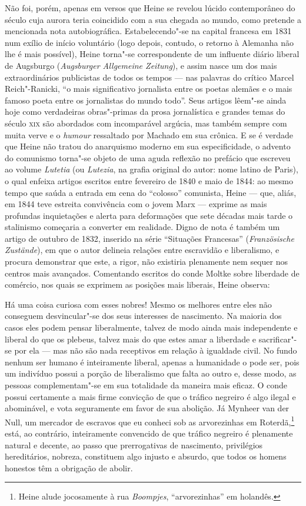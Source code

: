 Não foi, porém, apenas em versos que Heine se revelou lúcido
contemporâneo do século cuja aurora teria coincidido com a sua chegada
ao mundo, como pretende a mencionada nota autobiográfica.
Estabelecendo"-se na capital francesa em 1831 num exílio de início
voluntário (logo depois, contudo, o retorno à Alemanha não lhe é mais
possível), Heine torna"-se correspondente de um influente diário
liberal de Augsburgo (\textit{Augsburger Allgemeine Zeitung}), e assim
nasce um dos mais extraordinários publicistas de todos os tempos --- nas
palavras do crítico Marcel Reich"-Ranicki, “o mais significativo
jornalista entre os poetas alemães e o mais famoso poeta entre os
jornalistas do mundo todo”. Seus artigos lêem"-se ainda hoje como
verdadeiras obras"-primas da prosa jornalística e grandes temas do
século \textsc{xix} são abordados com incomparável argúcia, mas também sempre
com muita verve e o \textit{humour} ressaltado por Machado em sua
crônica. E se é verdade que Heine não tratou do anarquismo moderno em
sua especificidade, o advento do comunismo torna"-se objeto de uma
aguda reflexão no prefácio que escreveu ao volume \textit{Lutetia} (ou
\textit{Lutezia}, na grafia original do autor: nome latino de
Paris), o qual enfeixa artigos escritos entre fevereiro de 1840 e maio
de 1844: ao mesmo tempo que saúda a entrada em cena do “colosso”
comunista, Heine --- que, aliás, em 1844 teve estreita convivência com o
jovem Marx --- exprime as mais profundas inquietações e alerta para
deformações que sete décadas mais tarde o stalinismo começaria a
converter em realidade. Digno de nota é também um artigo de outubro de
1832, inserido na série “Situações Francesas” (\textit{Französische
Zustände}), em que o autor delineia relações entre escravidão e
liberalismo, e procura demonstrar que este, a rigor, não existiria
plenamente nem sequer nos centros mais avançados. Comentando escritos
do conde Moltke sobre liberdade de comércio, nos quais se exprimem as
posições mais liberais, Heine observa: 
\begin{hedraquote}
Há uma coisa curiosa com esses
nobres! Mesmo os melhores entre eles não conseguem desvincular"-se dos
seus interesses de nascimento. Na maioria dos casos eles podem pensar
liberalmente, talvez de modo ainda mais independente e liberal do que os
plebeus, talvez mais do que estes amar a liberdade e sacrificar"-se
por ela --- mas não são nada receptivos em relação à igualdade civil. No
fundo nenhum ser humano é inteiramente liberal, apenas a humanidade o
pode ser, pois um indivíduo possui a porção de liberalismo que falta ao
outro e, desse modo, as pessoas complementam"-se em sua totalidade da
maneira mais eficaz. O conde possui certamente a mais firme convicção
de que o tráfico negreiro é algo ilegal e abominável, e vota
seguramente em favor de sua abolição. Já Mynheer van der Null, um
mercador de escravos que eu conheci sob as arvorezinhas em Roterdã,\footnote{
Heine alude jocosamente à rua \textit{Boompjes}, “arvorezinhas” em
holandês.} está, ao contrário, inteiramente convencido de que
tráfico negreiro é plenamente natural e decente, ao passo que
prerrogativas de nascimento, privilégios hereditários, nobreza,
constituem algo injusto e absurdo, que todos os homens honestos têm a
obrigação de abolir.
\end{hedraquote}

